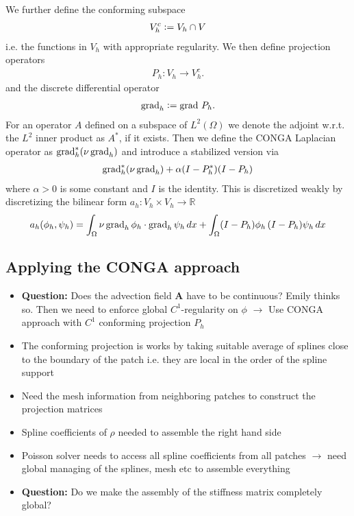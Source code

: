 \documentclass[presentation.tex]{subfiles}
\begin{document}
We further define the conforming subspace
\begin{align*}
    V_h^c \vcentcolon= V_h \cap V
\end{align*}
i.e. the functions in $V_h$ with appropriate regularity. We then define
projection operators
\begin{align*}
    P_h: V_h \rightarrow V_h^c.
\end{align*}
and the discrete differential operator
\begin{align*}
    \operatorname{grad}_h \vcentcolon= \operatorname{grad} \, P_h.
\end{align*}
For an operator $A$ defined on a subspace of $L^2(\Omega)$ we denote the 
adjoint w.r.t. the $L^2$ inner product as $A^*$, if it exists.
Then we define the CONGA Laplacian operator as $\operatorname{grad}_h^* (\nu \operatorname{grad}_h)$
and introduce a stabilized version via
\begin{align*}
    \operatorname{grad}_h^*(\nu \operatorname{grad}_h) + \alpha (I-P_h^*)(I-P_h)
\end{align*}
where $\alpha > 0$ is some constant and $I$ is the identity. This is discretized weakly by discretizing the bilinear
form $a_h: V_h \times V_h \rightarrow \mathbb{R}$
\begin{align*}
    a_h(\phi_h, \psi_h) = \int_\Omega \nu \operatorname{grad}_h \phi_h \cdot \operatorname{grad}_h \psi_h \, dx 
                        + \int_\Omega (I-P_h)\phi_h \, (I-P_h)\psi_h \, dx
\end{align*}

\subsection*{Applying the CONGA approach}
\begin{itemize}
    \item \textbf{Question:} Does the advection field $\mathbf{A}$ have to be
            continuous? Emily thinks so. Then we need to enforce global $C^1$-regularity on $\phi$ 
    $\rightarrow$ Use CONGA approach with $C^1$ conforming projection $P_h$
    \item   The conforming projection is works by taking suitable average of splines close to 
            the boundary of the patch i.e. they are local in the order of the spline support
    \item   Need the mesh information from neighboring patches
            to construct the projection matrices
    \item Spline coefficients of $\rho$ needed to assemble the right hand side
    \item Poisson solver needs to access all spline coefficients from all patches
            $\rightarrow$ need global managing of the splines, mesh etc 
            to assemble everything
    \item \textbf{Question:} Do we make the assembly of the stiffness matrix completely global?
\end{itemize}
\end{document}
